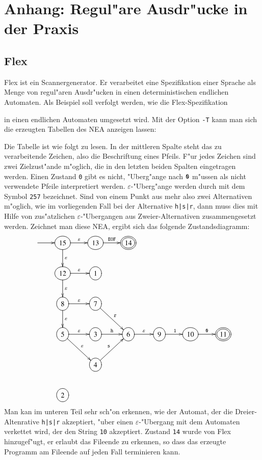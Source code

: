\section{Anhang: Regul"are Ausdr"ucke in der Praxis}
\subsection{Flex}
Flex ist ein Scannergenerator. Er verarbeitet eine Spezifikation einer
Sprache als Menge von regul"aren Ausdr"ucken in einen deterministischen 
endlichen Automaten. Als Beispiel soll verfolgt werden, wie die
Flex-Spezifikation

in einen endlichen Automaten umgesetzt wird. Mit der Option {\tt -T}
kann man sich die erzeugten Tabellen des NEA anzeigen lassen:

Die Tabelle ist wie folgt zu lesen.
In der mittleren Spalte steht das zu verarbeitende Zeichen, also
die Beschriftung eines Pfeils. F"ur jedes Zeichen sind zwei Zielzust"ande
m"oglich, die in den letzten beiden Spalten eingetragen werden. Einen
Zustand {\tt 0} gibt es nicht, "Uberg"ange nach ${\tt 0}$ m"ussen als
nicht verwendete Pfeile interpretiert werden. $\varepsilon$-"Uberg"ange
werden durch mit dem Symbol {\tt 257} bezeichnet. Sind von einem Punkt
aus mehr also zwei Alternativen m"oglich, wie im vorliegenden Fall
bei der Alternative {\tt h|s|r}, dann muss dies mit Hilfe von zus"atzlichen
$\varepsilon$-"Ubergangen aus Zweier-Alternativen zusammengesetzt werden.
Zeichnet man diese NEA, ergibt sich das folgende Zustandsdiagramm:
\[
\entrymodifiers={++[o][F]}
\xymatrix{
*+\txt{}\ar[r]
	&{15} \ar[r]^{\varepsilon} \ar[d]^{\varepsilon}
		&{13}\ar[r]^{{\tt EOF}}
			&*++[o][F=]{14}
\\
*+\txt{}
	&{12}\ar[d]^{\varepsilon} \ar[r]^{\varepsilon}
		&{1}
\\
*+\txt{}
	&{8}\ar[d]^{\varepsilon} \ar[r]^{\varepsilon}
		&{7}\ar[dr]^{\tt r}
\\
*+\txt{}
	&{5}\ar[dr]^{\varepsilon} \ar[r]^{\varepsilon}
		&{3}\ar[r]^{\tt h}
			&{6}\ar[r]^{\varepsilon}
				&{9}\ar[r]^{\tt 1}
					&{10}\ar[r]^{\tt 0}
						&*++[o][F=]{11}
\\
*+\txt{}
	&*+\txt{}
		&{4}\ar[ur]^{\tt s}
\\
*+\txt{}
	&{2}
}
\]
Man kan im unteren Teil sehr sch"on erkennen, wie der Automat, der
die Dreier-Altenrative {\tt h|s|r} akzeptiert, "uber einen
$\varepsilon$-"Ubergang mit dem Automaten verkettet wird, der 
den String {\tt 10} akzeptiert. Zustand {\tt 14} wurde von Flex
hinzugef"ugt, er erlaubt das Fileende zu erkennen, so dass das
erzeugte Programm am Fileende auf jeden Fall terminieren kann.

